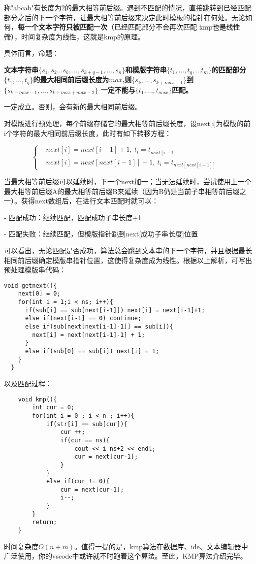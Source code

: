 \documentclass{article}
\begin{document}
	称"abcab"有长度为2的最大相等前后缀。遇到不匹配的情况，直接跳转到已经匹配部分之后的下一个字符，让最大相等前后缀来决定此时模板的指针在何处。无论如何，\textbf{每一个文本字符只被匹配一次}（已经匹配部分不会再次匹配 \sout{kmp也是线性筛}），时间复杂度为线性，这就是kmp的原理。

	具体而言，命题：

	\textbf{文本字符串$\{s_1,s_2...s_k,...,s_{k+q-1},...,s_n\}$和模版字符串$\{t_1,...,t_q,...t_m\}$的匹配部分 
	$ \{t_1, ..., t_q\}$的最大相同前后缀长度为$max$,则$\{s_{k},...,s_{k+max-1}\}$到$\{s_{k+max-1},...,s_{k+max+max-2}\}$
一定不能与$\{t_1,...,t_{max}\}$匹配。}

	一定成立。否则，会有新的最大相同前后缀。

	对模版进行预处理，每个前缀存储它的最大相等前后缀长度，设next[i]为模版的前i个字符的最大相同前后缀长度，此时有如下转移方程：

\begin{equation}
	\left\{
		\begin{aligned}
			&next[i] = next[i-1]+1, \ t_i = t_{next[i-1]} &\\
			&next[i] = next[next[i-1]]+1, \ t_i = t_{next[next[i-1]]} &
		\end{aligned}
	\right.
\end{equation}

当最大相等前后缀可以延续时，下一个next加一；当无法延续时，尝试使用上一个最大相等前后缀A的最大相等前后缀B来延续（因为B仍是当前子串相等前后缀之一）。获得next数组后，在进行文本匹配时就可以：

- 匹配成功：继续匹配，匹配成功子串长度+1

- 匹配失败：继续匹配，但模版指针跳到next[成功子串长度]位置

	可以看出，无论匹配是否成功，算法总会跳到文本串的下一个字符，并且根据最长相同前后缀确定模版串指针位置，这使得复杂度成为线性。根据以上解析，可写出预处理模版串代码：

\begin{verbatim}
void getnext(){
	next[0] = 0;
	for(int i = 1;i < ns; i++){
	  if(sub[i] == sub[next[i-1]]) next[i] = next[i-1]+1;
	  else if(next[i-1] == 0) continue;
	  else if(sub[next[next[i-1]-1]] == sub[i]){
		next[i] = next[next[i-1]-1] + 1;
	  }
	  else if(sub[0] == sub[i]) next[i] = 1;
	}
  }
\end{verbatim}

以及匹配过程：

\begin{verbatim}
	void kmp(){
		int cur = 0;
		for(int i = 0 ; i < n ; i++){
			if(str[i] == sub[cur]){
				cur ++;
				if(cur == ns){
					cout << i-ns+2 << endl;
					cur = next[cur-1];
				}
			}
			else if(cur != 0){
				cur = next[cur-1];
				i--;
			}
		}
		return;
	}
\end{verbatim}

时间复杂度$O(n+m)$。值得一提的是，kmp算法在数据库、ide、文本编辑器中广泛使用，你的vscode中或许就不时跑着这个算法。至此，KMP算法介绍完毕。
\end{document}
